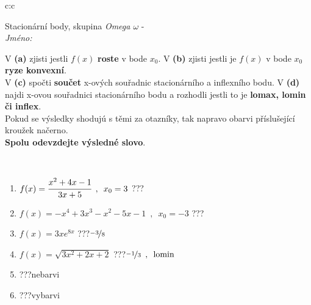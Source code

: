 \documentclass[10pt]{report}
\begin{document}
\newpage
\thispagestyle{empty}
\begin{tabular}{c:c}
\begin{minipage}[c][104.5mm][t]{0.5\linewidth}
\begin{center}
\vspace{7mm}
{\huge Stacionární body, skupina \textit{Omega $\omega$} -}\\[5mm]
\textit{Jméno:}\phantom{xxxxxxxxxxxxxxxxxxxxxxxxxxxxxxxxxxxxxxxxxxxxxxxxxxxxxxxxxxxxxxxxx}\\[5mm]
\begin{minipage}{0.95\linewidth}
\begin{center}
{\small V \textbf{(a)} zjisti jestli $f(x)$ \textbf{roste} v bode $x_0$. V \textbf{(b)} zjisti jestli je $f(x)$ v bode $x_0$ \textbf{ryze konvexní}.\\V \textbf{(c)} spočti \textbf{součet} x-ových souřadnic stacionárního a inflexního bodu. V \textbf{(d)} najdi x-ovou souřadnici stacionárního bodu a rozhodli jestli to je \textbf{lomax, lomin či inflex}.\\Pokud se výsledky shodujú s těmi za otazníky, tak napravo obarvi příslušející kroužek načerno.\\\textbf{Spolu odevzdejte výsledné slovo}}.
\end{center}
\end{minipage}
\\[1mm]
\begin{minipage}{0.79\linewidth}
\begin{center}
\begin{varwidth}{\linewidth}
\begin{enumerate}
\normalsize
\item $f(x)=\cfrac{x^2+4x-1}{3x+5}\enspace , \enspace x_0=3$\quad \dotfill\; ???\;\dotfill \quad {}
\item $f(x)=-x^4+3x^3-x^2-5x-1\enspace , \enspace x_0=-3$\quad \dotfill\; ???\;\dotfill \quad {}
\item $f(x)=3xe^{8x}$\quad \dotfill\; ???\;\dotfill \quad $\nicefrac{-3}{8}$
\item $f(x)=\sqrt{3x^2+2x+2}$\quad \dotfill\; ???\;\dotfill \quad $\nicefrac{-1}{3}\enspace , \enspace \mathrm{lomin}$
\item \quad \dotfill\; ???\;\dotfill \quad nebarvi
\item \quad \dotfill\; ???\;\dotfill \quad vybarvi
\end{enumerate}
\end{varwidth}
\end{center}

\end{minipage}
\end{center}
\end{minipage}
\end{tabular}
\end{document}
